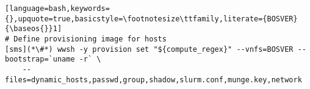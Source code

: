 \begin{lstlisting}[language=bash,keywords={},upquote=true,basicstyle=\footnotesize\ttfamily,literate={BOSVER}{\baseos{}}1]
# Define provisioning image for hosts
[sms](*\#*) wwsh -y provision set "${compute_regex}" --vnfs=BOSVER --bootstrap=`uname -r` \
    --files=dynamic_hosts,passwd,group,shadow,slurm.conf,munge.key,network 
\end{lstlisting}

